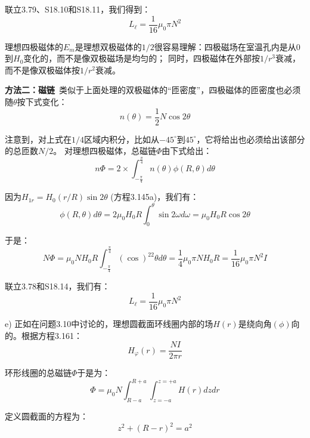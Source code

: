 联立3.79、S18.10和S18.11，我们得到：
 \begin{equation}%
L_\ell=\frac{1}{16}\mu_0\pi N^2
\end{equation}

理想四极磁体的$E_m$是理想双极磁体的$1/2$很容易理解：四极磁场在室温孔内是从$0$到$H_0$变化的，而不是像双极磁场是均匀的；
同时，四极磁体在外部按$1/r^3$衰减，而不是像双极磁体按$1/r^2$衰减。

\textbf{方法二：磁链}\ 类似于上面处理的双极磁体的“匝密度”，四极磁体的匝密度也必须随$\theta$按下式变化：
 \begin{equation}%
n(\theta)=\frac{1}{2}N\cos 2\theta
\end{equation}

注意到，对上式在$1/4$区域内积分，比如从$-45^\circ$到$45^\circ$，它将给出也必须给出该部分的总匝数$N/2$。
对理想四极磁体，总磁链$\Phi$由下式给出：
\begin{equation}%
n\Phi=2\times\int_{-\frac{\pi}{4}}^{\frac{\pi}{4}}n(\theta)\phi(R,\theta)d\theta
\end{equation}

因为$H_{1r} = H_0(r/R) \sin 2\theta$ (方程3.145a)，我们有：
 \begin{equation}%
\phi(R,\theta)d\theta=2\mu_0H_0R\int_{0}^{\theta}\sin 2\omega d\omega=\mu_0H_0R\cos 2\theta
\end{equation}

于是：
 \begin{equation}%
N\Phi=\mu_0NH_0R\int_{-\frac{\pi}{4}}^{\frac{\pi}{4}}(\cos)^22\theta d\theta
=\frac{1}{4}\mu_0\pi NH_0R=\frac{1}{16}\mu_0\pi N^2I
\end{equation}

联立3.78和S18.14，我们有：
 \begin{equation}%
L_\ell=\frac{1}{16}\mu_0\pi N^2
\end{equation}

e) 正如在问题3.10中讨论的，理想圆截面环线圈内部的场$H(r)$是绕向角$(\phi)$向的。根据方程3.161：
 \begin{equation}%
H_\varphi(r)=\frac{NI}{2\pi r}
\end{equation}

环形线圈的总磁链$\Phi$于是为：
\begin{equation}%
\Phi=\mu_0N\int_{R-a}^{R+a}\int_{z=-a}^{z=+a}H(r)dzdr
\end{equation}

定义圆截面的方程为：
 \begin{equation}%
z^2+(R-r)^2=a^2
\end{equation}

